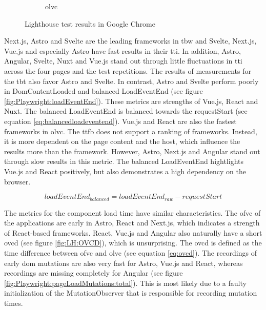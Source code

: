 \documentclass[a4paper, 12pt]{article}
\begin{document}
\begin{figure}[!h]
\begin{subfigure}{0.49\linewidth}
\begin{center}
    \end{center}
    \caption{\acrfull{olvc}}\label{subfig:LH:observedLastVisualChange}
  \end{subfigure}
  \caption{Lighthouse test results in Google Chrome}\label{fig:lighthouseResults}
\end{figure}

Next.js, Astro and Svelte are the leading frameworks in \acrshort{tbw} and Svelte, Next.js, Vue.js and especially Astro have fast results in their \acrshort{tti}.
In addition, Astro, Angular, Svelte, Nuxt and Vue.js stand out through little fluctuations in \acrshort{tti} across the four pages and the test repetitions.
The results of measurements for the \acrshort{tbt} also favor Astro and Svelte.
In contrast, Astro and Svelte perform poorly in DomContentLoaded and balanced LoadEventEnd (see figure \ref{fig:Playwright:loadEventEnd}).
These metrics are strengths of Vue.js, React and Nuxt.
The balanced LoadEventEnd is balanced towards the requestStart (see equation \ref{eq:balancedloadeventend}).
Vue.js and React are also the fastest frameworks in \acrshort{olvc}.
The \acrshort{ttfb} does not support a ranking of frameworks.
Instead, it is more dependent on the page content and the host, which influence the results more than the framework.
However, Astro, Next.js and Angular stand out through slow results in this metric.
The balanced LoadEventEnd hightlights Vue.js and React positively, but also demonstrates a high dependency on the browser.

\begin{equation}\label{eq:balancedloadeventend}
\mathit{loadEventEnd}_\mathit{balanced} = \mathit{loadEventEnd}_\mathit{raw} - \mathit{requestStart}
\end{equation}

The metrics for the component load time have similar characteristics.
The \acrshort{ofvc} of the applications are early in Astro, React and Next.js, which indicates a strength of React-based frameworks.
React, Vue.js and Angular also naturally have a short \acrfull{ovcd} (see figure \ref{fig:LH:OVCD}), which is unsurprising.
The \acrshort{ovcd} is defined as the time difference between \acrshort{ofvc} and \acrshort{olvc} (see equation \ref{eq:ovcd}).
The recordings of early \acrshort{dom} mutations are also very fast for Astro, Vue.js and React, whereas recordings are missing completely for Angular (see figure \ref{fig:Playwright:pageLoadMutations:total}).
This is most likely due to a faulty initialization of the MutationObserver that is responsible for recording mutation times.
\end{document}
